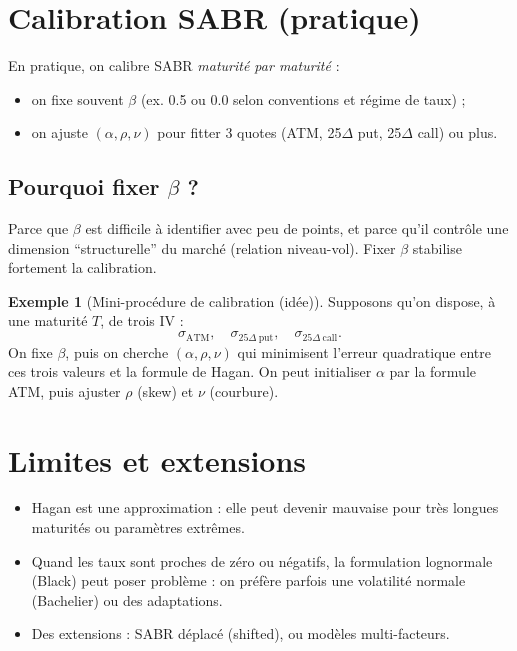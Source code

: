 \documentclass[11pt,a4paper]{report}
\newcommand{\1}{\mathbbm{1}}
\theoremstyle{definition}
\newtheorem{example}{Exemple}[chapter]
\theoremstyle{plain}
\theoremstyle{remark}
\begin{document}
\section{Calibration SABR (pratique)}
\label{sec:sabr_calib}

En pratique, on calibre SABR \emph{maturité par maturité} :
\begin{itemize}
  \item on fixe souvent $\beta$ (ex. 0.5 ou 0.0 selon conventions et régime de taux) ;
  \item on ajuste $(\alpha,\rho,\nu)$ pour fitter 3 quotes (ATM, 25$\Delta$ put, 25$\Delta$ call) ou plus.
\end{itemize}

\subsection{Pourquoi fixer $\beta$ ?}
Parce que $\beta$ est difficile à identifier avec peu de points, et parce qu'il contrôle une dimension ``structurelle''
du marché (relation niveau-vol). Fixer $\beta$ stabilise fortement la calibration.

\begin{example}[Mini-procédure de calibration (idée)]
Supposons qu'on dispose, à une maturité $T$, de trois IV :
\[
\sigma_{\mathrm{ATM}},\quad \sigma_{25\Delta\ \mathrm{put}},\quad \sigma_{25\Delta\ \mathrm{call}}.
\]
On fixe $\beta$, puis on cherche $(\alpha,\rho,\nu)$ qui minimisent l'erreur quadratique entre ces trois valeurs et la formule de Hagan.
On peut initialiser $\alpha$ par la formule ATM, puis ajuster $\rho$ (skew) et $\nu$ (courbure).
\end{example}

\section{Limites et extensions}
\begin{itemize}
  \item Hagan est une approximation : elle peut devenir mauvaise pour très longues maturités ou paramètres extrêmes.
  \item Quand les taux sont proches de zéro ou négatifs, la formulation lognormale (Black) peut poser problème :
  on préfère parfois une volatilité normale (Bachelier) ou des adaptations.
  \item Des extensions : SABR déplacé (shifted), ou modèles multi-facteurs.
\end{itemize}
\end{document}
